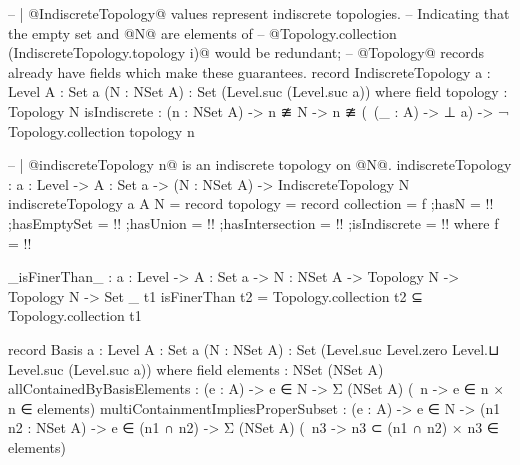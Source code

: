 \begin{code}
-- | @IndiscreteTopology@ values represent indiscrete topologies.
-- Indicating that the empty set and @N@ are elements of
-- @Topology.collection (IndiscreteTopology.topology i)@ would be redundant;
-- @Topology@ records already have fields which make these guarantees.
record IndiscreteTopology {a : Level}
                          {A : Set a}
                          (N : NSet A) : Set (Level.suc (Level.suc a)) where
  field
    topology : Topology N
    isIndiscrete : (n : NSet A) ->
                   n ≇ N ->
                   n ≇ (\ (_ : A) -> ⊥ {a})
                   -> ¬ Topology.collection topology n

-- | @indiscreteTopology n@ is an indiscrete topology on @N@.
indiscreteTopology : {a : Level} ->
                     {A : Set a} ->
                     (N : NSet A) ->
                     IndiscreteTopology N
indiscreteTopology {a} {A} N = record
  {topology = record
     {collection = f
     ;hasN = {!!}
     ;hasEmptySet = {!!}
     ;hasUnion = {!!}
     ;hasIntersection = {!!}
     }
  ;isIndiscrete = {!!}}
  where
  f = {!!}
  
_isFinerThan_ : {a : Level} ->
                {A : Set a} ->
                {N : NSet A} ->
                Topology N ->
                Topology N ->
                Set _
t1 isFinerThan t2 = Topology.collection t2 ⊆ Topology.collection t1

record Basis {a : Level}
             {A : Set a}
             (N : NSet A) : Set (Level.suc Level.zero Level.⊔ Level.suc (Level.suc a)) where
  field
   elements : NSet (NSet A)
   allContainedByBasisElements :
     (e : A) ->
     e ∈ N ->
     Σ (NSet A) (\ n -> e ∈ n × n ∈ elements)
   multiContainmentImpliesProperSubset :
     (e : A) ->
     e ∈ N ->
     (n1 n2 : NSet A) ->
     e ∈ (n1 ∩ n2) ->
     Σ (NSet A) (\ n3 -> n3 ⊂ (n1 ∩ n2) × n3 ∈ elements)
\end{code}
